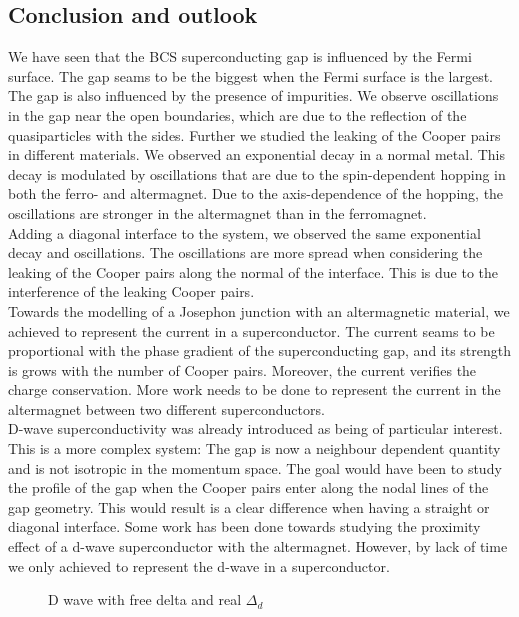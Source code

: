 \documentclass[..\main.tex]{subfile}
\begin{document}
\subsection{Conclusion and outlook}
We have seen that the BCS superconducting gap is influenced by the Fermi surface. The gap seams to be the biggest when the Fermi surface is the largest.
The gap is also influenced by the presence of impurities. We observe oscillations in the gap near the open boundaries, which are due to the reflection
of the quasiparticles with the sides.
Further we studied the leaking of the Cooper pairs in different materials. We observed an exponential decay in a normal metal.
This decay is modulated by oscillations that are due to the spin-dependent hopping in both the ferro- and altermagnet.
Due to the axis-dependence of the hopping, the oscillations are stronger in the altermagnet than in the ferromagnet.\\
Adding a diagonal interface to the system, we observed the same exponential decay and oscillations. The oscillations are more spread when considering
the leaking of the Cooper pairs along the normal of the interface. This is due to the interference of the leaking Cooper pairs.\\
Towards the modelling of a Josephon junction with an altermagnetic material, we achieved to represent the current in a superconductor.
The current seams to be proportional with the phase gradient of the superconducting gap, and its strength is grows with the number of Cooper pairs.
Moreover, the current verifies the charge conservation.
More work needs to be done to represent the current in the altermagnet between two different superconductors.\\

D-wave superconductivity was already introduced as being of particular interest. This is a more complex system:
The gap is now a neighbour dependent quantity and is not isotropic in the momentum space. The goal would have been 
to study the profile of the gap when the Cooper pairs enter along the nodal lines of the gap geometry. This
would result is a clear difference when having a straight or diagonal interface. 
 Some work has been done towards studying the
proximity effect of a d-wave superconductor with the altermagnet. However, by lack of time we only achieved to represent the d-wave in a superconductor.\\

\begin{figure}[H]
    
    \caption{D wave with free delta and real $\Delta_d$}
\end{figure}
\end{document}
